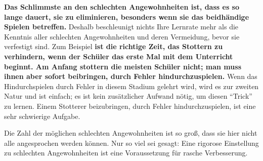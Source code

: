 \textbf{Das Schlimmste an den schlechten Angewohnheiten ist, dass es so lange dauert, sie zu eliminieren, besonders wenn sie das beidhändige Spielen betreffen.}
Deshalb beschleunigt nichts Ihre Lernrate mehr als die Kenntnis aller schlechten Angewohnheiten und deren Vermeidung, bevor sie verfestigt sind.
Zum Beispiel \textbf{ist die richtige Zeit, das Stottern zu verhindern, wenn der Schüler das erste Mal mit dem Unterricht beginnt.
Am Anfang stottern die meisten Schüler nicht;
man muss ihnen aber sofort beibringen, durch Fehler hindurchzuspielen.}
Wenn das Hindurchspielen durch Fehler in diesem Stadium gelehrt wird, wird es zur zweiten Natur und ist einfach;
es ist kein zusätzlicher Aufwand nötig, um diesen \enquote{Trick} zu lernen.
Einem Stotterer beizubringen, durch Fehler hindurchzuspielen, ist eine sehr schwierige Aufgabe.

Die Zahl der möglichen schlechten Angewohnheiten ist so groß, dass sie hier nicht alle angesprochen werden können.
Nur so viel sei gesagt: Eine rigorose Einstellung zu schlechten Angewohnheiten ist eine Voraussetzung für rasche Verbesserung.



